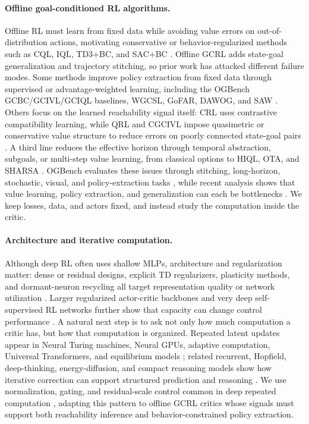 \documentclass{article}
\begin{document}
\paragraph{Offline goal-conditioned RL algorithms.}
Offline RL must learn from fixed data while avoiding value errors on out-of-distribution actions, motivating conservative or behavior-regularized methods such as CQL, IQL, TD3+BC, and SAC+BC \citep{cql, iql, td3, td3bc, sac}. Offline GCRL adds state-goal generalization and trajectory stitching, so prior work has attacked different failure modes. Some methods improve policy extraction from fixed data through supervised or advantage-weighted learning, including the OGBench GCBC/GCIVL/GCIQL baselines, WGCSL, GoFAR, DAWOG, and SAW \citep{ogbench, wgcsL, gofar, dawog, saw}. Others focus on the learned reachability signal itself: CRL uses contrastive compatibility learning, while QRL and CGCIVL impose quasimetric or conservative value structure to reduce errors on poorly connected state-goal pairs \citep{crl, qrl, cgcivl}. A third line reduces the effective horizon through temporal abstraction, subgoals, or multi-step value learning, from classical options to HIQL, OTA, and SHARSA \citep{options, hiql, ota, horizon_reduction}. OGBench evaluates these issues through stitching, long-horizon, stochastic, visual, and policy-extraction tasks \citep{ogbench}, while recent analysis shows that value learning, policy extraction, and generalization can each be bottlenecks \citep{value_bottleneck}. We keep losses, data, and actors fixed, and instead study the computation inside the critic.

\paragraph{Architecture and iterative computation.}
Although deep RL often uses shallow MLPs, architecture and regularization matter: dense or residual designs, explicit TD regularizers, plasticity methods, and dormant-neuron recycling all target representation quality or network utilization \citep{resnet, d2rl, dr3, implicit_underparam, primacy_bias, dormant_neurons}. Larger regularized actor-critic backbones and very deep self-supervised RL networks further show that capacity can change control performance \citep{bro, simba, thousand_layers}. A natural next step is to ask not only how much computation a critic has, but how that computation is organized. Repeated latent updates appear in Neural Turing machines, Neural GPUs, adaptive computation, Universal Transformers, and equilibrium models \citep{ntm, neural_gpu, act, universal_transformer, deq}; related recurrent, Hopfield, deep-thinking, energy-diffusion, and compact reasoning models show how iterative correction can support structured prediction and reasoning \citep{recurrent_relational_networks, modern_hopfield, deep_thinking, energy_diffusion, hrm, trm, urm}. We use normalization, gating, and residual-scale control common in deep repeated computation \citep{layer_norm, shazeer_glu, layerscale}, adapting this pattern to offline GCRL critics whose signals must support both reachability inference and behavior-constrained policy extraction.
\end{document}
